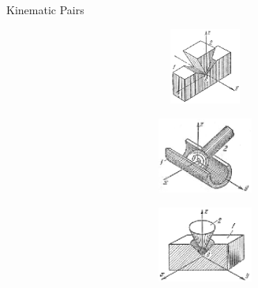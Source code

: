 \documentclass[aspectratio=169]{beamer}
\begin{document}
\begin{frame}[t]{Kinematic Pairs}
\begin{figure}[H]
    \begin{subfigure}{0.32\textwidth}
        \centering\includegraphics[height=2.5cm,width=1\textwidth,keepaspectratio]{hkp_4.png}
        \label{fig:hkp_4.png}
    \end{subfigure}
    \begin{subfigure}{0.32\textwidth}
        \centering\includegraphics[height=2.5cm,width=1\textwidth,keepaspectratio]{hkp_5.png}
        \label{fig:hkp_5.png}
    \end{subfigure}
    \begin{subfigure}{0.32\textwidth}
        \centering\includegraphics[height=2.5cm,width=1\textwidth,keepaspectratio]{hkp_6.png}
        \label{fig:hkp_6.png}
    \end{subfigure}
\end{figure}
\end{frame}
\end{document}
